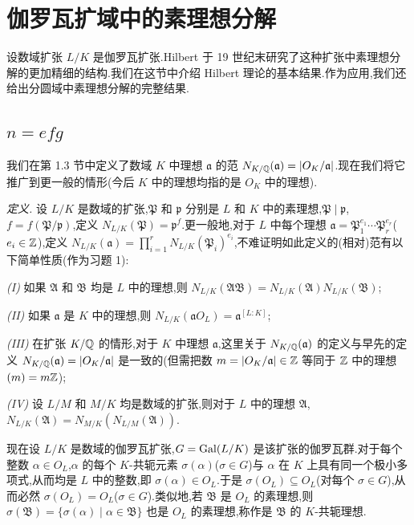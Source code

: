 \section{伽罗瓦扩域中的素理想分解}\label{sec:ch2-s3}

设数域扩张 $L/K$ 是伽罗瓦扩张.Hilbert 于 19 世纪末研究了这种扩张中素理想分解的更加精细的结构.我们在这节中介绍 Hilbert 理论的基本结果.作为应用,我们还给出分圆域中素理想分解的完整结果.

\subsection{\texorpdfstring{$n=efg$}{n=efg}}\label{sec:ch2-s3-1}

我们在第 1.3 节中定义了数域 $K$ 中理想 $\mathfrak{a}$ 的范 $N_{K/\mathbb{Q}}(\mathfrak{a})=|O_K/\mathfrak{a}|$.现在我们将它推广到更一般的情形(今后 $K$ 中的理想均指的是 $O_K$ 中的理想).

\emph{定义.} 设 $L/K$ 是数域的扩张,$\mathfrak{P}$ 和 $\mathfrak{p}$ 分别是 $L$ 和 $K$ 中的素理想,$\mathfrak{P}\mid\mathfrak{p}$,$f=f(\mathfrak{P}/\mathfrak{p})$,定义 $N_{L/K}(\mathfrak{P})=\mathfrak{p}^f$.更一般地,对于 $L$ 中每个理想 $\mathfrak{a}=\mathfrak{P}_1^{e_1}\cdots\mathfrak{P}_r^{e_r}$($e_i\in\mathbb{Z}$),定义 $N_{L/K}(\mathfrak{a})=\prod_{i=1}^{r}N_{L/K}(\mathfrak{P}_i)^{e_i}$,不难证明如此定义的(相对)范有以下简单性质(作为习题 1):

\emph{(I)} 如果 $\mathfrak{A}$ 和 $\mathfrak{B}$ 均是 $L$ 中的理想,则 $N_{L/K}(\mathfrak{AB})=N_{L/K}(\mathfrak{A})N_{L/K}(\mathfrak{B})$;

\emph{(II)} 如果 $\mathfrak{a}$ 是 $K$ 中的理想,则 $N_{L/K}(\mathfrak{a}O_L)=\mathfrak{a}^{[L:K]}$;

\emph{(III)} 在扩张 $K/\mathbb{Q}$ 的情形,对于 $K$ 中理想 $\mathfrak{a}$,这里关于 $N_{K/\mathbb{Q}}(\mathfrak{a})$ 的定义与早先的定义 $N_{K/\mathbb{Q}}(\mathfrak{a})=|O_K/\mathfrak{a}|$ 是一致的(但需把数 $m=|O_K/\mathfrak{a}|\in\mathbb{Z}$ 等同于 $\mathbb{Z}$ 中的理想 $(m)=m\mathbb{Z}$);

\emph{(IV)} 设 $L/M$ 和 $M/K$ 均是数域的扩张,则对于 $L$ 中的理想 $\mathfrak{A}$,$N_{L/K}(\mathfrak{A})=N_{M/K}(N_{L/M}(\mathfrak{A}))$.

现在设 $L/K$ 是数域的伽罗瓦扩张,$G=\operatorname{Gal}(L/K)$ 是该扩张的伽罗瓦群.对于每个整数 $\alpha\in O_L$,$\alpha$ 的每个 $K$-共轭元素 $\sigma(\alpha)$($\sigma\in G$)与 $\alpha$ 在 $K$ 上具有同一个极小多项式,从而均是 $L$ 中的整数,即 $\sigma(\alpha)\in O_L$.于是 $\sigma(O_L)\subseteq O_L$(对每个 $\sigma\in G$),从而必然 $\sigma(O_L)=O_L$($\sigma\in G$).类似地,若 $\mathfrak{B}$ 是 $O_L$ 的素理想,则 $\sigma(\mathfrak{B})=\{\sigma(\alpha)\mid\alpha\in\mathfrak{B}\}$ 也是 $O_L$ 的素理想,称作是 $\mathfrak{B}$ 的 $K$-共轭理想.


